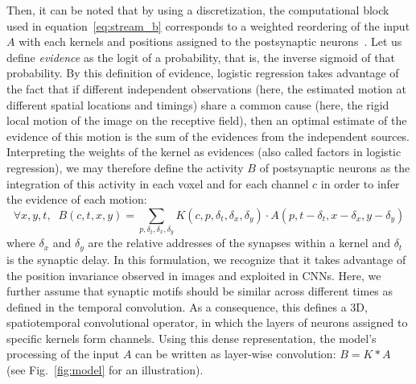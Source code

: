 \documentclass[default]{sn-jnl}%
\theoremstyle{thmstyleone}%
\theoremstyle{thmstyletwo}%
\theoremstyle{thmstylethree}%
\newcommand{\seeFig}[1]{see Fig.~\ref{fig:#1}}%
\newcommand{\synapticdelay}{\delta} %
\newcommand{\timev}{t} %
\newcommand{\kernel}{K} %
\newcommand{\class}{c} %
\begin{document}
Then, it can be noted that by using a discretization, the computational block used in equation~\eqref{eq:stream_b} corresponds to a weighted reordering of the input $A$ with each kernels and positions assigned to the postsynaptic neurons~\citep{grimaldi_learning_2022}. Let us define \emph{evidence} as the logit of a probability, that is, the inverse sigmoid of that probability. By this definition of evidence, logistic regression takes advantage of the fact that if different independent observations (here, the estimated motion at different spatial locations and timings) share a common cause (here, the rigid local motion of the image on the receptive field), then an optimal estimate of the evidence of this motion is the sum of the evidences from the independent sources. Interpreting the weights of the kernel as evidences (also called factors in logistic regression), we may therefore define the activity $B$ of postsynaptic neurons as the integration of this activity in each voxel and for each channel $\class$ in order to infer the evidence of each motion:
%
\begin{equation}\label{eq:kernel_b}
\forall x, y, \timev, \; \;
B(\class, \timev, x, y)
= \sum_{p, \synapticdelay_\timev, \delta_x, \delta_y} \kernel(\class, p, \synapticdelay_\timev, \delta_x, \delta_y) \cdot A(p, \timev-\synapticdelay_\timev, x - \delta_x, y - \delta_y)
\end{equation}
%
where $\delta_x$ and $\delta_y$ are the relative addresses of the synapses within a kernel and $\delta_\timev$ is the synaptic delay. In this formulation, we recognize that it takes advantage of the position invariance observed in images and exploited in CNNs. Here, we further assume that synaptic motifs should be similar across different times as defined in the temporal convolution. As a consequence, this defines a 3D, spatiotemporal convolutional operator, in which the layers of neurons assigned to specific kernels form channels. Using this dense representation, the model's processing of the input $A$ can be written as layer-wise convolution: $B = \kernel \ast A$ (\seeFig{model} for an illustration). 
\end{document}
